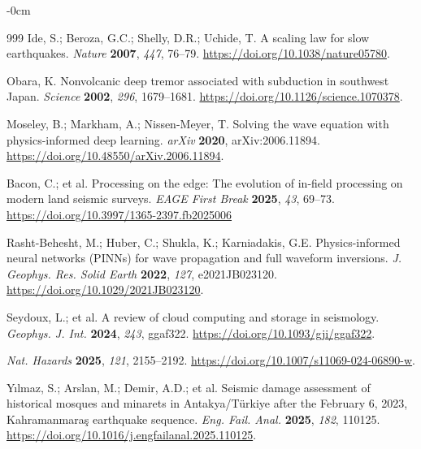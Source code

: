 \documentclass[data,article,accept,pdftex,moreauthors]{Definitions/mdpi}
\begin{document}
\begin{adjustwidth}{-\extralength}{0cm}
\begin{thebibliography}{999}
Ide, S.; Beroza, G.C.; Shelly, D.R.; Uchide, T. A scaling law for slow earthquakes. \emph{Nature} \textbf{2007}, \emph{447}, 76--79. \url{https://doi.org/10.1038/nature05780}.

Obara, K. Nonvolcanic deep tremor associated with subduction in southwest Japan. \emph{Science} \textbf{2002}, \emph{296}, 1679--1681. \url{https://doi.org/10.1126/science.1070378}.

Moseley, B.; Markham, A.; Nissen-Meyer, T. Solving the wave equation with physics-informed deep learning. \emph{arXiv} \textbf{2020}, arXiv:2006.11894. \url{https://doi.org/10.48550/arXiv.2006.11894}.

Bacon, C.; et al. Processing on the edge: The evolution of in-field processing on modern land seismic surveys. \emph{EAGE First Break} \textbf{2025}, \emph{43}, 69--73. \url{https://doi.org/10.3997/1365-2397.fb2025006}

Rasht-Behesht, M.; Huber, C.; Shukla, K.; Karniadakis, G.E. Physics-informed neural networks (PINNs) for wave propagation and full waveform inversions. \emph{J. Geophys. Res. Solid Earth} \textbf{2022}, \emph{127}, e2021JB023120. \url{https://doi.org/10.1029/2021JB023120}.

Seydoux, L.; et al. A review of cloud computing and storage in seismology. \emph{Geophys. J. Int.} \textbf{2024}, \emph{243}, ggaf322. \url{https://doi.org/10.1093/gji/ggaf322}.

 \emph{Nat. Hazards} \textbf{2025}, \emph{121}, 2155--2192. \url{https://doi.org/10.1007/s11069-024-06890-w}.

Yılmaz, S.; Arslan, M.; Demir, A.D.; et al. Seismic damage assessment of historical mosques and minarets in Antakya/Türkiye after the February 6, 2023, Kahramanmara\c{s} earthquake sequence. \emph{Eng. Fail. Anal.} \textbf{2025}, \emph{182}, 110125. \url{https://doi.org/10.1016/j.engfailanal.2025.110125}.


\end{thebibliography}
\end{adjustwidth}
\end{document}
